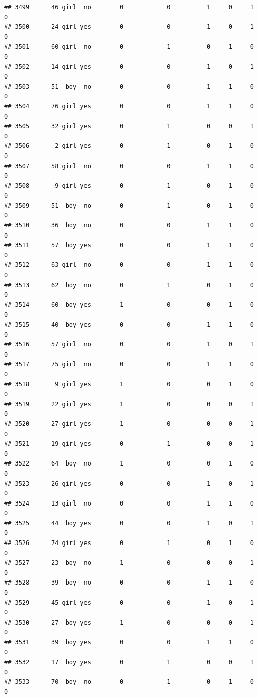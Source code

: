 \documentclass[man]{apa6}
\begin{document}
\begin{verbatim}
## 3499      46 girl  no        0            0          1     0     1     0
## 3500      24 girl yes        0            0          1     0     1     0
## 3501      60 girl  no        0            1          0     1     0     0
## 3502      14 girl yes        0            0          1     0     1     0
## 3503      51  boy  no        0            0          1     1     0     0
## 3504      76 girl yes        0            0          1     1     0     0
## 3505      32 girl yes        0            1          0     0     1     0
## 3506       2 girl yes        0            1          0     1     0     0
## 3507      58 girl  no        0            0          1     1     0     0
## 3508       9 girl yes        0            1          0     1     0     0
## 3509      51  boy  no        0            1          0     1     0     0
## 3510      36  boy  no        0            0          1     1     0     0
## 3511      57  boy yes        0            0          1     1     0     0
## 3512      63 girl  no        0            0          1     1     0     0
## 3513      62  boy  no        0            1          0     1     0     0
## 3514      60  boy yes        1            0          0     1     0     0
## 3515      40  boy yes        0            0          1     1     0     0
## 3516      57 girl  no        0            0          1     0     1     0
## 3517      75 girl  no        0            0          1     1     0     0
## 3518       9 girl yes        1            0          0     1     0     0
## 3519      22 girl yes        1            0          0     0     1     0
## 3520      27 girl yes        1            0          0     0     1     0
## 3521      19 girl yes        0            1          0     0     1     0
## 3522      64  boy  no        1            0          0     1     0     0
## 3523      26 girl yes        0            0          1     0     1     0
## 3524      13 girl  no        0            0          1     1     0     0
## 3525      44  boy yes        0            0          1     0     1     0
## 3526      74 girl yes        0            1          0     1     0     0
## 3527      23  boy  no        1            0          0     0     1     0
## 3528      39  boy  no        0            0          1     1     0     0
## 3529      45 girl yes        0            0          1     0     1     0
## 3530      27  boy yes        1            0          0     0     1     0
## 3531      39  boy yes        0            0          1     1     0     0
## 3532      17  boy yes        0            1          0     0     1     0
## 3533      70  boy  no        0            1          0     1     0     0

\end{verbatim}
\end{document}

